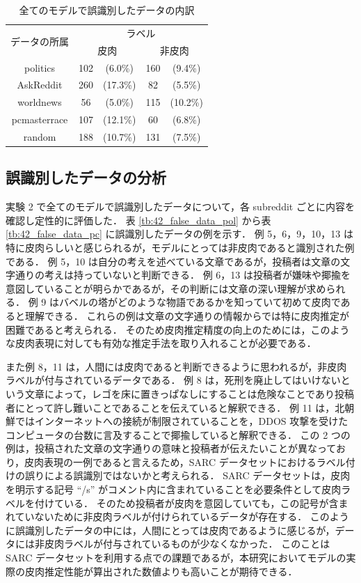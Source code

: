 \begin{table}[tb]
  \caption{全てのモデルで誤識別したデータの内訳}
  \label{tb:4_result4}
  \centering
  \begin{tabular}{c c c c c} \hline

\multirow{2}{*}{データの所属} & \multicolumn{4}{c}{ラベル} \\ \cline{2-5}
 & \multicolumn{2}{c}{皮肉} & \multicolumn{2}{c}{非皮肉} \\ \hline
politics & 102 & (6.0\%) & 160 & (9.4\%) \\
AskReddit & 260 & (17.3\%) & 82 & (5.5\%) \\
worldnews & 56 & (5.0\%) & 115 & (10.2\%) \\
pcmasterrace &107 & (12.1\%) & 60 & (6.8\%) \\
random & 188 & (10.7\%) & 131 & (7.5\%) \\ \hline

  \end{tabular}
\end{table}


\subsection{誤識別したデータの分析}
実験 2 で全てのモデルで誤識別したデータについて，各 subreddit ごとに内容を確認し定性的に評価した．
表 \ref{tb:42_false_data_pol} から表 \ref{tb:42_false_data_pc} に誤識別したデータの例を示す．
例 5，6，9，10，13 は特に皮肉らしいと感じられるが，モデルにとっては非皮肉であると識別された例である．
例 5，10 は自分の考えを述べている文章であるが，投稿者は文章の文字通りの考えは持っていないと判断できる．
例 6，13 は投稿者が嫌味や揶揄を意図していることが明らかであるが，その判断には文章の深い理解が求められる．
例 9 はバベルの塔がどのような物語であるかを知っていて初めて皮肉であると理解できる．
これらの例は文章の文字通りの情報からでは特に皮肉推定が困難であると考えられる．
そのため皮肉推定精度の向上のためには，このような皮肉表現に対しても有効な推定手法を取り入れることが必要である．
\par
また例 8，11 は，人間には皮肉であると判断できるように思われるが，非皮肉ラベルが付与されているデータである．
例 8 は，死刑を廃止してはいけないという文章によって，レゴを床に置きっぱなしにすることは危険なことであり投稿者にとって許し難いことであることを伝えていると解釈できる．
例 11 は，北朝鮮ではインターネットへの接続が制限されていることを，DDOS 攻撃を受けたコンピュータの台数に言及することで揶揄していると解釈できる．
この 2 つの例は，投稿された文章の文字通りの意味と投稿者が伝えたいことが異なっており，皮肉表現の一例であると言えるため，SARC データセットにおけるラベル付けの誤りによる誤識別ではないかと考えられる．
SARC データセットは，皮肉を明示する記号 “/s” がコメント内に含まれていることを必要条件として皮肉ラベルを付けている．
そのため投稿者が皮肉を意図していても，この記号が含まれていないために非皮肉ラベルが付けられているデータが存在する．
このように誤識別したデータの中には，人間にとっては皮肉であるように感じるが，データには非皮肉ラベルが付与されているものが少なくなかった．
このことは SARC データセットを利用する点での課題であるが，本研究においてモデルの実際の皮肉推定性能が算出された数値よりも高いことが期待できる．


